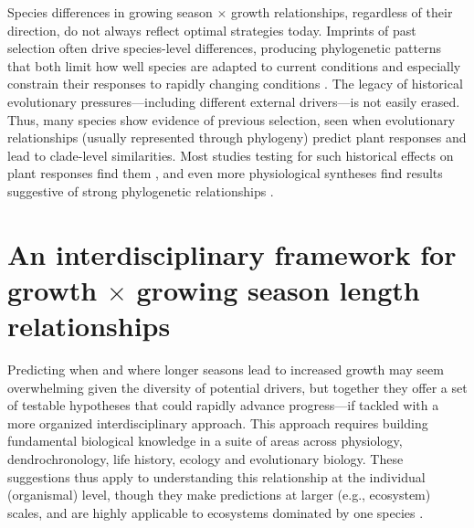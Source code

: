 \documentclass[11pt]{article}
\begin{document}
Species differences in growing season $\times$ growth relationships, regardless of their direction, do not always reflect optimal strategies today. Imprints of past selection often drive species-level differences, producing phylogenetic patterns that both limit how well species are adapted to current conditions and especially constrain their responses to rapidly changing conditions \citep{Ackerly:2009ly}. The legacy of historical evolutionary pressures---including different external drivers---is not easily erased.  Thus, many species show evidence of previous selection, seen when evolutionary relationships (usually represented through phylogeny) predict plant responses and lead to clade-level similarities. Most studies testing for such historical effects on plant responses find them \citep[e.g.,][]{phenophylo}, and even more physiological syntheses find results suggestive of strong phylogenetic relationships \citep[though they are more rarely formally tested, e.g.,][]{way2010differential}. 



\section*{An interdisciplinary framework for growth $\times$ growing season length relationships}
 
Predicting when and where longer seasons lead to increased growth may seem overwhelming given the diversity of potential drivers, but together they offer a set of testable hypotheses that could rapidly advance progress---if tackled with a more organized interdisciplinary approach.  %
This approach requires building fundamental biological knowledge in a suite of areas across physiology, dendrochronology, life history, ecology and evolutionary biology. These suggestions thus apply to understanding this relationship at the individual (organismal) level, though they make predictions at larger (e.g., ecosystem) scales, and are highly applicable to ecosystems dominated by one species \citep[e.g.,][]{chen1999effects}. %
\end{document}
